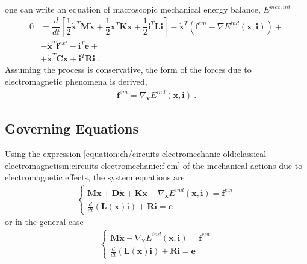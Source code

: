 \documentclass[letterpaper,10pt,english]{jupyterBook}
\begin{document}
\sphinxAtStartPar
one can write an equation of macroscopic mechanical energy balance, \(E^{mec, int}\)
\begin{equation*}
\begin{split}
0 & = \dfrac{d}{dt} \left[ \dfrac{1}{2} \dot{\mathbf{x}}^T \mathbf{M} \dot{\mathbf{x}} + \dfrac{1}{2} \mathbf{x}^T \mathbf{K} \mathbf{x} + \dfrac{1}{2} \mathbf{i}^T \mathbf{L} \mathbf{i} \right] - \dot{\mathbf{x}}^T \left( \mathbf{f}^{em} - \nabla E^{ind}(\mathbf{x}, \mathbf{i})  \right) + \\
  & - \dot{\mathbf{x}}^T \mathbf{f}^{ext} - \mathbf{i}^T \mathbf{e} + \\
  & + \dot{\mathbf{x}}^T \mathbf{C} \dot{\mathbf{x}} + \mathbf{i}^T \mathbf{R} \mathbf{i} \ .
\end{split}
\end{equation*}
\sphinxAtStartPar
Assuming the process is conservative, the form of the forces due to electromagnetic phenomena is derived,
\begin{equation}\label{equation:ch/circuits-electromechanic-old:classical-electromagnetism:circuits-electromechanic:f-em}
\begin{split}\mathbf{f}^{em} = \nabla_{\mathbf{x}} E^{ind}(\mathbf{x}, \mathbf{i}) \ .\end{split}
\end{equation}

\subsection{Governing Equations}
\label{\detokenize{ch/circuits-electromechanic-old:governing-equations}}
\sphinxAtStartPar
Using the expression \eqref{equation:ch/circuits-electromechanic-old:classical-electromagnetism:circuits-electromechanic:f-em} of the mechanical actions due to electromagnetic effects, the system equations are
\begin{equation*}
\begin{split}\begin{cases}
  \mathbf{M} \ddot{\mathbf{x}} + \mathbf{D} \dot{\mathbf{x}} + \mathbf{K} \mathbf{x} - \nabla_{\mathbf{x}} E^{ind}(\mathbf{x}, \mathbf{i})  = \mathbf{f}^{ext} \\
  \frac{d}{dt} \left( \mathbf{L}(\mathbf{x}) \mathbf{i} \right) + \mathbf{R} \mathbf{i} = \mathbf{e}
\end{cases}\end{split}
\end{equation*}
\sphinxAtStartPar
or in the general case
\begin{equation*}
\begin{split}\begin{cases}
  \mathbf{M} \ddot{\mathbf{x}} - \nabla_{\mathbf{x}} E^{ind} ( \mathbf{x}, \mathbf{i}) = \mathbf{f}^{ext} \\
  \frac{d}{dt} \left( \mathbf{L}(\mathbf{x}) \mathbf{i} \right) + \mathbf{R} \mathbf{i} = \mathbf{e}
\end{cases}\end{split}
\end{equation*}
\end{document}
